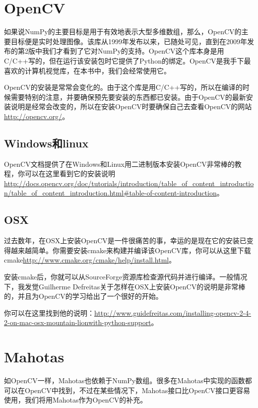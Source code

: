 \documentclass[color=green,mathpazo,titlestyle=hang]{elegantbook}
\begin{document}
\section{OpenCV}

如果说NumPy的主要目标是用于有效地表示大型多维数组，那么，OpenCV的主要目标便是实时处理图像。该库从1999年发布以来，已随处可见，直到在2009年发布的第2版中我们才看到了它对NumPy的支持。OpenCV这个库本身是用C/C++写的，但在运行该安装包时它提供了Python的绑定。OpenCV是我手下最喜欢的计算机视觉库，在本书中，我们会经常使用它。

OpenCV的安装是常常会变化的。由于这个库是用C/C++写的，所以在编译的时候需要特别的注意，并要确保预先要安装的东西都已安装。由于OpenCV的最新安装说明是经常会改变的，所以在安装OpenCV时要确保自己去查看OpenCV的网站\url{http://opencv.org/}。

\subsection{Windows和linux}

OpenCV文档提供了在Windows和Linux用二进制版本安装OpenCV非常棒的教程，你可以在这里看到它的安装说明\url{http://docs.opencv.org/doc/tutorials/introduction/table_of_content_introduction/table_of_content_introduction.html#table-of-content-introduction}。

\subsection{OSX}

过去数年，在OSX上安装OpenCV是一件很痛苦的事，幸运的是现在它的安装已变得越来越简单。你需要安装cmake来构建并编译该OpenCV库，你可以从这里下载cmake\href{http://www.cmake.org/cmake/help/install.html}{http://www.cmake.org/cmake/help/install.html}。

安装cmake后，你就可以从SourceForge资源库检查源代码并进行编译。一般情况下，我发觉Guilherme Defreitas关于怎样在OSX上安装OpenCV的说明是非常棒的，并且为OpenCV的学习给出了一个很好的开始。

你可以在这里找到他的说明：\href{http://www.guidefreitas.com/installing-opencv-2-4-2-on-mac-osx-mountain-lionwith-python-support}{http://www.guidefreitas.com/installing-opencv-2-4-2-on-mac-osx-mountain-lionwith-python-support}。

\section{Mahotas}

如OpenCV一样，Mahotas也依赖于NumPy数组。很多在Mahotas中实现的函数都可以在OpenCV中找到，不过在某些情况下，Mahotas接口比OpenCV接口更容易使用，我们将用Mahotas作为OpenCV的补充。
\end{document}
